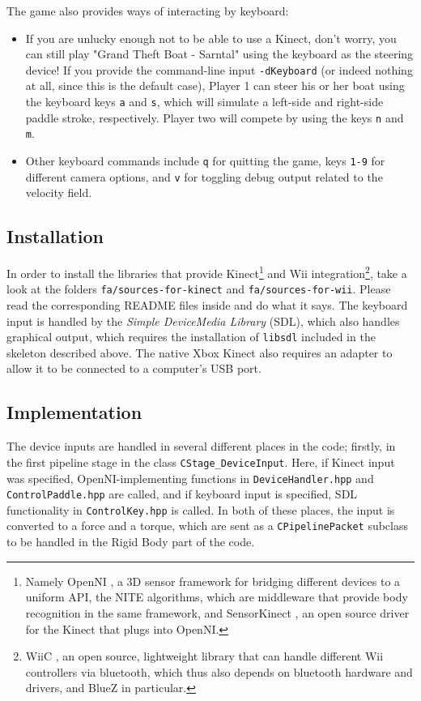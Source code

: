 The game also provides ways of interacting by keyboard:
\begin{itemize}
\item If you are unlucky enough not to be able to use a Kinect, don't worry, you can still play "Grand Theft Boat - Sarntal" using the keyboard as the steering device! If you provide the command-line input \texttt{-dKeyboard} (or indeed nothing at all, since this is the default case), Player 1 can steer his or her boat using the keyboard keys \texttt{a} and \texttt{s}, which will simulate a left-side and right-side paddle stroke, respectively. Player two will compete by using the keys \texttt{n} and \texttt{m}.
\item Other keyboard commands include \texttt{q} for quitting the game, keys \texttt{1-9} for different camera options, and \texttt{v} for toggling debug output related to the velocity field.
\end{itemize}



\subsection{Installation}
In order to install the libraries that provide Kinect\footnote{Namely OpenNI \cite{OpenNI}, a 3D sensor framework for bridging different devices to a uniform API, the NITE algorithms, which are middleware that provide body recognition in the same framework, and SensorKinect \cite{SensorKinect}, an open source driver for the Kinect that plugs into OpenNI.} and Wii integration\footnote{WiiC \cite{WiiC}, an open source, lightweight library that can handle different Wii controllers via bluetooth, which thus also depends on bluetooth hardware and drivers, and BlueZ in particular.}, take a look at the folders \texttt{fa/sources-for-kinect} and \texttt{fa/sources-for-wii}. Please read the corresponding README files inside and do what it says. The keyboard input is handled by the \emph{Simple DeviceMedia Library} (SDL), which also handles graphical output, which requires the installation of \texttt{libsdl} included in the skeleton described above. The native Xbox Kinect also requires an adapter to allow it to be connected to a computer's USB port.

\subsection{Implementation}
The device inputs are handled in several different places in the code; firstly, in the first pipeline stage in the class \texttt{CStage_DeviceInput}. Here, if Kinect input was specified, OpenNI-implementing functions in \texttt{DeviceHandler.hpp} and \texttt{ControlPaddle.hpp} are called, and if keyboard input is specified, SDL functionality in \texttt{ControlKey.hpp} is called. In both of these places, the input is converted to a force and a torque, which are sent as a \texttt{CPipelinePacket} subclass to be handled in the Rigid Body part of the code.

